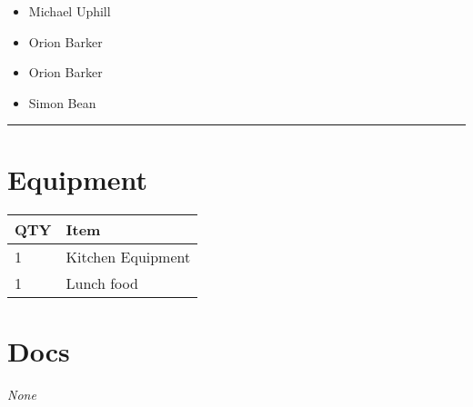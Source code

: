 \documentclass[10pt]{article}
\begin{document}
		

	\begin{multicols}{2}

		\begin{itemize}
									\item Michael Uphill
									\item Orion Barker
						\end{itemize}

		\vfill\null
		\columnbreak

		\begin{itemize}
									\item Orion Barker
									\item Simon Bean
						\end{itemize}

		\vfill\null

		\end{multicols}



			\vspace{0.5cm}
	\hrule
	\vspace{0.5cm}

	\begin{multicols}{2}

		\section*{\faWrench \: Equipment}

		
	\begin{center}
			\begin{tabular}{p{2cm}p{4cm}}


				\textbf{QTY} & \textbf{Item} \\\toprule
												1&Kitchen Equipment\\\midrule
												1&Lunch food\\\midrule
								\end{tabular}

			\end{center}

		
		\vfill\null
		\columnbreak

			\section*{\faFile \: Docs}
		 	\textit{None}
	

		\vfill\null

		\end{multicols}
\end{document}
